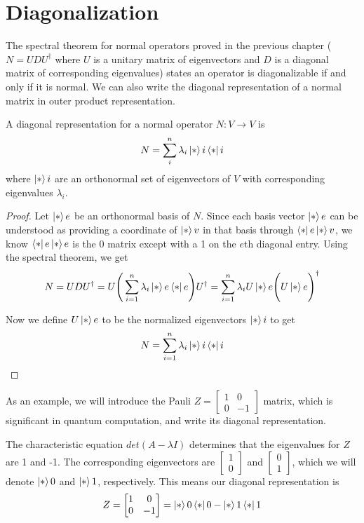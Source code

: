 \section{Diagonalization}

The spectral theorem for normal operators proved in the previous chapter ($N = UDU^{\dagger}$ where $U$ is a unitary matrix of eigenvectors and $D$ is a diagonal matrix of corresponding eigenvalues) states an operator is diagonalizable if and only if it is normal. We can also write the diagonal representation of a normal matrix in outer product representation.  

\begin{theorem}
A diagonal representation for a normal operator $N: V \rightarrow V$ is 
$$N = \sum_{i}^{n} \lambda_{i} \ket*{i} \bra*{i}$$
where $\ket*{i}$ are an orthonormal set of eigenvectors of $V$ with corresponding eigenvalues $\lambda_{i}$. 
\end{theorem}

\begin{proof}
Let $\ket*{e}$ be an orthonormal basis of $N$. Since each basis vector $\ket*{e}$ can be understood as providing a coordinate of $\ket*{v}$ in that basis through $\bra*{e}\ket*{v}$, we know $\bra*{e}\ket*{e}$ is the 0 matrix except with a 1 on the $e$th diagonal entry. Using the spectral theorem, we get 
$$N = UDU^{\dagger} = U \Bigg( \sum_{i=1}^{n} \lambda_{i} \ket*{e}\bra*{e} \Bigg) U^{\dagger} = \sum_{i=1}^{n} \lambda_{i} U \ket*{e} \Bigg( U \ket*{e} \Bigg)^{\dagger}$$

Now we define $U \ket*{e}$ to be the normalized eigenvectors $\ket*{i}$ to get 
$$N = \sum_{i=1}^{n} \lambda_{i} \ket*{i} \bra*{i}$$
\end{proof}

As an example, we will introduce the Pauli $Z = \begin{bmatrix}
1 & 0 \\
0 & -1
\end{bmatrix}$ matrix, which is significant in quantum computation, and write its diagonal representation.  

The characteristic equation $det(A - \lambda I)$ determines that the eigenvalues for $Z$ are 1 and -1. The corresponding eigenvectors are $\begin{bmatrix}
1 \\ 0
\end{bmatrix}$ and $\begin{bmatrix}
0 \\ 1
\end{bmatrix}$, which we will denote $\ket*{0}$ and $\ket*{1}$, respectively. This means our diagonal representation is 
$$Z = \begin{bmatrix}
1 & 0 \\
0 & -1
\end{bmatrix} = \ket*{0}\bra*{0} - \ket*{1}\bra*{1}$$

